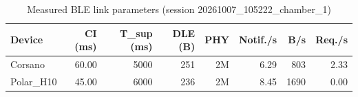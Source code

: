 \begin{table}[t]
\caption{Measured BLE link parameters (session 20261007_105222_chamber_1)}
\label{tab:link-params}
\centering
\scriptsize
\setlength{\tabcolsep}{3pt}
\begin{tabular}{lrrrrrrr}
\toprule
\textbf{Device} & \textbf{CI (ms)} & \textbf{T_sup (ms)} & \textbf{DLE (B)} & \textbf{PHY} & \textbf{Notif./s} & \textbf{B/s} & \textbf{Req./s} \\
\midrule
Corsano & 60.00 & 5000 & 251 & 2M & 6.29 & 803 & 2.33 \\
Polar\_H10 & 45.00 & 6000 & 236 & 2M & 8.45 & 1690 & 0.00 \\
\bottomrule
\end{tabular}
\end{table}
